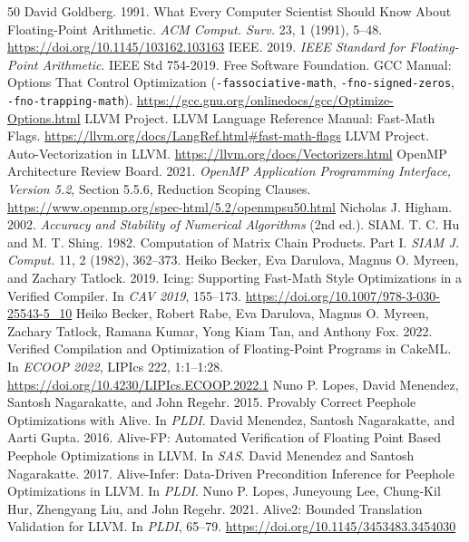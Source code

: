 \documentclass[acmsmall,review,anonymous,nonacm]{acmart}
\begin{document}
\begin{thebibliography}{50}
 David Goldberg. 1991. What Every Computer Scientist Should Know
About Floating-Point Arithmetic. \textit{ACM Comput. Surv.} 23, 1 (1991), 5--48.
\url{https://doi.org/10.1145/103162.103163}
 IEEE. 2019. \textit{IEEE Standard for Floating-Point Arithmetic}.
IEEE Std 754-2019.
 Free Software Foundation. GCC Manual: Options That Control
Optimization (\texttt{-fassociative-math}, \texttt{-fno-signed-zeros},
\texttt{-fno-trapping-math}).
\url{https://gcc.gnu.org/onlinedocs/gcc/Optimize-Options.html}
 LLVM Project. LLVM Language Reference Manual: Fast-Math Flags.
\url{https://llvm.org/docs/LangRef.html#fast-math-flags}
 LLVM Project. Auto-Vectorization in LLVM.
\url{https://llvm.org/docs/Vectorizers.html}
 OpenMP Architecture Review Board. 2021. \textit{OpenMP
Application Programming Interface, Version 5.2}, Section 5.5.6, Reduction
Scoping Clauses. \url{https://www.openmp.org/spec-html/5.2/openmpsu50.html}
 Nicholas J. Higham. 2002. \textit{Accuracy and Stability of
Numerical Algorithms} (2nd ed.). SIAM.
 T. C. Hu and M. T. Shing. 1982. Computation of Matrix Chain
Products. Part I. \textit{SIAM J. Comput.} 11, 2 (1982), 362--373.
 Heiko Becker, Eva Darulova, Magnus O. Myreen, and Zachary Tatlock.
2019. Icing: Supporting Fast-Math Style Optimizations in a Verified Compiler. In
\textit{CAV 2019}, 155--173. \url{https://doi.org/10.1007/978-3-030-25543-5_10}
 Heiko Becker, Robert Rabe, Eva Darulova, Magnus O. Myreen,
Zachary Tatlock, Ramana Kumar, Yong Kiam Tan, and Anthony Fox. 2022. Verified
Compilation and Optimization of Floating-Point Programs in CakeML. In
\textit{ECOOP 2022}, LIPIcs 222, 1:1--1:28.
\url{https://doi.org/10.4230/LIPIcs.ECOOP.2022.1}
 Nuno P. Lopes, David Menendez, Santosh Nagarakatte, and John
Regehr. 2015. Provably Correct Peephole Optimizations with Alive. In \textit{PLDI}.
 David Menendez, Santosh Nagarakatte, and Aarti Gupta. 2016.
Alive-FP: Automated Verification of Floating Point Based Peephole Optimizations in
LLVM. In \textit{SAS}.
 David Menendez and Santosh Nagarakatte. 2017. Alive-Infer:
Data-Driven Precondition Inference for Peephole Optimizations in LLVM. In
\textit{PLDI}.
 Nuno P. Lopes, Juneyoung Lee, Chung-Kil Hur, Zhengyang Liu, and
John Regehr. 2021. Alive2: Bounded Translation Validation for LLVM. In
\textit{PLDI}, 65--79. \url{https://doi.org/10.1145/3453483.3454030}

\end{thebibliography}
\end{document}
